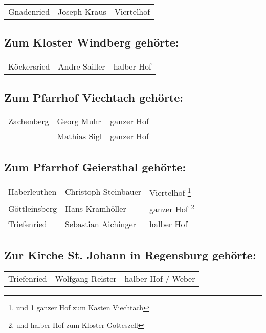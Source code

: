 \documentclass[12pt,a4pager]{book}
\begin{document}
\begin{longtable}{l|l|l}
Gnadenried & Joseph Kraus & Viertelhof\\
\end{longtable}

\subsection{Zum Kloster Windberg gehörte:}

\begin{longtable}{l|l|l}
Köckersried & Andre Sailler & halber Hof\\
\end{longtable}

\subsection{Zum Pfarrhof Viechtach gehörte:}

\begin{longtable}{l|l|l}
Zachenberg & Georg Muhr & ganzer Hof\\
& Mathias Sigl & ganzer Hof\\
\end{longtable}

\subsection{Zum Pfarrhof Geiersthal gehörte:}

\begin{longtable}{l|l|l}
Haberleuthen & Christoph Steinbauer & Viertelhof \footnote{und 1 ganzer Hof zum
Kasten Viechtach}\\

Göttleinsberg & Hans Kramhöller & ganzer Hof \footnote{und halber Hof zum
Kloster Gotteszell}\\

Triefenried & Sebastian Aichinger & halber Hof\\
\end{longtable}

\subsection{Zur Kirche St. Johann in Regensburg gehörte:}

\begin{longtable}{l|l|l}
Triefenried & Wolfgang Reister & halber Hof / Weber\\
\end{longtable}
\end{document}
